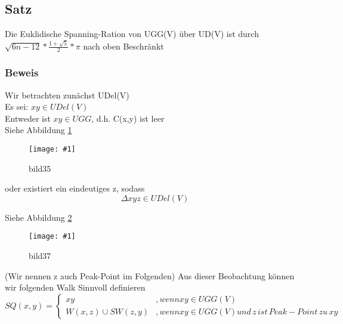 \documentclass{article}
\newcommand{\bild}[4]{ %
	\begin{figure}[h!]
		\centering
		\texttt{[image: \#1]}
		\caption{#3}
		\label{#4}
	\end{figure}	
}
\newcommand{\sieheBild}[4]{
	Siehe Abbildung \ref{#4}
	\bild{#1}{#2}{#3}{#4}
}
\begin{document}
\subsection*{Satz}
Die Euklidische Spanning-Ration von UGG(V) über UD(V) ist durch $\sqrt{6n-12} * \frac{1+ \sqrt{5}}{2} * \pi$ nach oben Beschränkt

\subsubsection*{Beweis}
Wir betrachten zunächst UDel(V)\\
Es sei: $xy \in UDel(V)$\\
Entweder ist $xy \in UGG$, d.h. C(x,y) ist leer\\
\sieheBild{Bilder/35.png}{0.4}{bild35}{Bild 35}
oder existiert ein eindeutiges z, sodass \[
\Delta xyz \in UDel(V)
\]
\sieheBild{Bilder/36.png}{0.4}{bild37}{Bild 36}
(Wir nennen z auch Peak-Point im Folgenden)
Aus dieser Beobachtung können wir folgenden Walk Sinnvoll definieren
\begin{equation}
SQ(x,y) = 
\begin{cases}
xy & , wenn xy \in UGG(V)\\
W(x,z) \cup SW(z,y) & , wenn xy \in UGG(V) und\, z\, ist\, Peak-Point\, zu\, xy
\end{cases} 
\end{equation}
\end{document}
